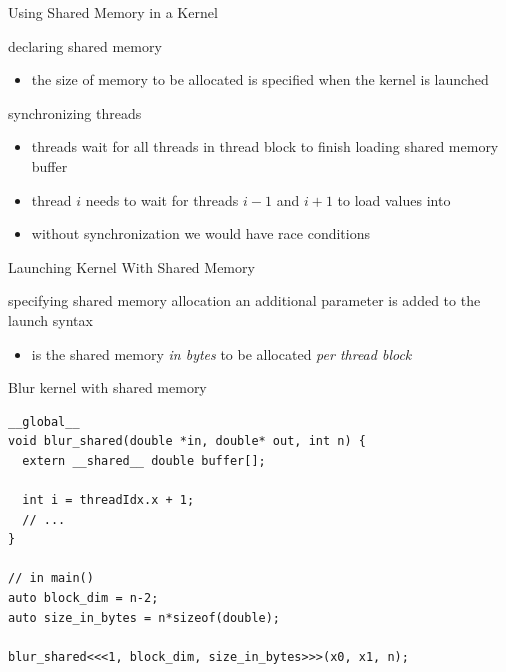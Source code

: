 \begin{frame}[fragile]{Using Shared Memory in a Kernel}
    \begin{info}{declaring shared memory}
        \centering {}
        \begin{itemize}
            \item the size of memory to be allocated is specified when the kernel is launched
        \end{itemize}
    \end{info}

    \begin{info}{synchronizing threads}
        \centering {}
        \begin{itemize}
            \item threads wait for all threads in thread block to finish loading shared memory buffer
            \item thread $i$ needs to wait for threads $i-1$ and $i+1$ to load values into 
            \item without synchronization we would have race conditions
        \end{itemize}
    \end{info}

\end{frame}

\begin{frame}[fragile]{Launching Kernel With Shared Memory}
    \begin{info}{specifying shared memory allocation}
        an additional parameter is added to the launch syntax\\
        \centering {}
        \begin{itemize}
            \item {} is the shared memory \emph{in bytes} to be allocated \emph{per thread block}
        \end{itemize}
    \end{info}

    \begin{code}{Blur kernel with shared memory}
        \begin{lstlisting}[style=boxcudatiny]
__global__
void blur_shared(double *in, double* out, int n) {
  extern __shared__ double buffer[];

  int i = threadIdx.x + 1;
  // ...
}

// in main()
auto block_dim = n-2;
auto size_in_bytes = n*sizeof(double);

blur_shared<<<1, block_dim, size_in_bytes>>>(x0, x1, n);
        \end{lstlisting}
    \end{code}

\end{frame}

